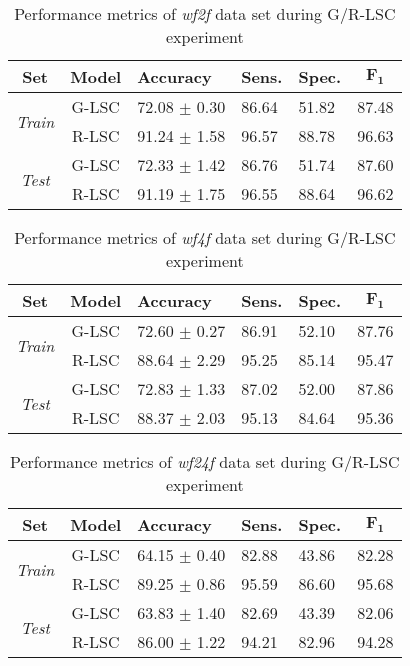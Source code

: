 \begin{table}[!htb]
	\caption{\label{tab:GvR_LSC_performance_wf2f}Performance metrics of \textit{wf2f} data set during \mbox{G/R-LSC} experiment}
	\centering
	\begin{tabular}{@{}cclllc@{}}
		\toprule
		\textbf{Set} & \textbf{Model} & \textbf{Accuracy} & \textbf{Sens.} & \textbf{Spec.} & $\mathbf{F_1}$ \\ \midrule
        \multirow{2}{*}{\textit{Train}}   
        & G-LSC & 72.08 $\pm$ 0.30 & 86.64 & 51.82 & 87.48 \\
		& R-LSC & 91.24 $\pm$ 1.58 & 96.57 & 88.78 & 96.63 \\
		\midrule
        \multirow{2}{*}{\textit{Test}}    
        & G-LSC & 72.33 $\pm$ 1.42 & 86.76 & 51.74 & 87.60 \\
        & R-LSC & 91.19 $\pm$ 1.75 & 96.55 & 88.64 & 96.62 \\
        \bottomrule
	\end{tabular}
\end{table}

\begin{table}[!htb]
	\caption{\label{tab:GvR_LSC_performance_wf4f}Performance metrics of \textit{wf4f} data set during \mbox{G/R-LSC} experiment}
	\centering
	\begin{tabular}{@{}cclllc@{}}
		\toprule
		\textbf{Set} & \textbf{Model} & \textbf{Accuracy} & \textbf{Sens.} & \textbf{Spec.} & $\mathbf{F_1}$ \\ \midrule
        \multirow{2}{*}{\textit{Train}}   
        & G-LSC & 72.60 $\pm$ 0.27 & 86.91 & 52.10 & 87.76 \\
		& R-LSC & 88.64 $\pm$ 2.29 & 95.25 & 85.14 & 95.47 \\
		\midrule
        \multirow{2}{*}{\textit{Test}}    
        & G-LSC & 72.83 $\pm$ 1.33 & 87.02 & 52.00 & 87.86 \\
        & R-LSC & 88.37 $\pm$ 2.03 & 95.13 & 84.64 & 95.36 \\ 
        \bottomrule
	\end{tabular}
\end{table}

\begin{table}[!htb]
	\caption{\label{tab:GvR_LSC_performance_wf24f}Performance metrics of \textit{wf24f} data set during \mbox{G/R-LSC} experiment}
	\centering
	\begin{tabular}{@{}cclllc@{}}
		\toprule
		\textbf{Set} & \textbf{Model} & \textbf{Accuracy} & \textbf{Sens.} & \textbf{Spec.} & $\mathbf{F_1}$ \\ \midrule
        \multirow{2}{*}{\textit{Train}}   
        & G-LSC & 64.15 $\pm$ 0.40 & 82.88 & 43.86 & 82.28 \\
		& R-LSC & 89.25 $\pm$ 0.86 & 95.59 & 86.60 & 95.68 \\
		\midrule
        \multirow{2}{*}{\textit{Test}}    
        & G-LSC & 63.83 $\pm$ 1.40 & 82.69 & 43.39 & 82.06 \\
        & R-LSC & 86.00 $\pm$ 1.22 & 94.21 & 82.96 & 94.28 \\ 
        \bottomrule
	\end{tabular}
\end{table}